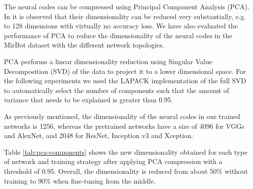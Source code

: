 \documentclass[final, twocolumn]{elsarticle}
\begin{document}
The neural codes can be compressed using Principal Component Analysis (PCA). In \cite{BabenkoSCL14} it is observed that their dimensionality can be reduced very substantially, e.g. to 128 dimensions with virtually no accuracy loss. We have also evaluated the performance of PCA to reduce the dimensionality of the neural codes in the MirBot dataset with the different network topologies.


PCA performs a linear dimensionality reduction using Singular Value Decomposition (SVD) of the data to project it to a lower dimensional space. For the following experiments we used the LAPACK implementation of the full SVD to automatically select the number of components such that the amount of variance that needs to be explained is greater than 0.95.



As previously mentioned, the dimensionality of the neural codes in our trained networks is 1256, whereas the pretrained networks have a size of 4096 for VGGs and AlexNet, and 2048 for ResNet, Inception v3 and Xception.

Table \ref{tab:pca-components} shows the new dimensionality obtained for each type of network and training strategy after applying PCA compression with a threshold of 0.95.
Overall, the dimensionality is reduced from about  50\% without training to 90\% when fine-tuning from the middle.
\end{document}

